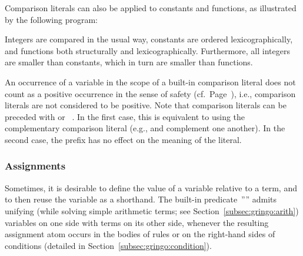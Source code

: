 \begin{example}\label{ex:symb:pred}
Comparison literals can also be applied to constants and functions,
as illustrated by the following program:%
%

%
Integers are compared in the usual way, constants are ordered lexicographically,
and functions both structurally and lexicographically.
Furthermore, all integers are smaller than constants,
which in turn are smaller than functions.
\eexample
\end{example}

\begin{note}
An occurrence of a variable in the scope of a built-in comparison literal
does not count as a positive occurrence in the sense of safety (cf.\ Page~\pageref{pg:safe}),
i.e.,
comparison literals are not considered to be positive.
Note that comparison literals can be preceded with  or ~.
In the first case, this is equivalent to using the complementary comparison literal
(e.g., \code{<} and \code{>=} complement one another).
In the second case, the prefix has no effect on the meaning of the literal.
%
\end{note}

\subsubsection{Assignments}\label{subsec:gringo:assign}

Sometimes, it is desirable to define the value of a variable relative to a term,
and to then reuse the variable as a shorthand.
The built-in predicate~''\code{=}'' admits unifying
(while solving simple arithmetic terms; see Section~\ref{subsec:gringo:arith})
variables on one side with terms on its other side,
whenever the resulting assignment atom occurs
in the bodies of rules or on the right-hand sides of conditions
(detailed in Section~\ref{subsec:gringo:condition}).

